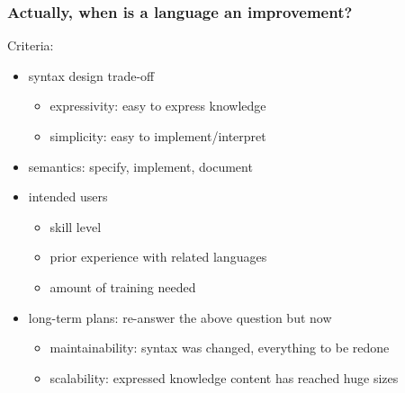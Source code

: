 \begin{frame}\frametitle{Actually, when is a language an improvement?}
Criteria:
\begin{itemize}
\item syntax design trade-off
 \begin{itemize}
  \item expressivity: easy to express knowledge
  \item simplicity: easy to implement/interpret
 \end{itemize}
\item semantics: specify, implement, document
\item intended users
 \begin{itemize}
  \item skill level
  \item prior experience with related languages
  \item amount of training needed
 \end{itemize}
\item long-term plans: re-answer the above question but now
 \begin{itemize}
  \item maintainability: syntax was changed, everything to be redone
  \item scalability: expressed knowledge content has reached huge sizes
 \end{itemize}
\end{itemize}
\end{frame}

